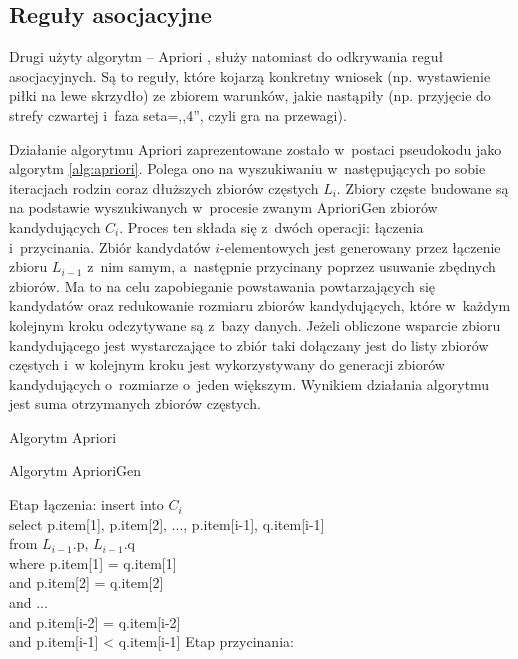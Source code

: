 \documentclass[a4paper,twoside,12pt]{book}
\newenvironment{algorytm}[1][]
  {\renewcommand{\algorithmcfname}{Algorytm}%
   \begin{algorithm}[#1]%
  }{\end{algorithm}}
\begin{document}
\subsection{Reguły asocjacyjne}
Drugi użyty algorytm -- Apriori \cite{bib:apriori}, służy natomiast do odkrywania reguł asocjacyjnych. Są to reguły, które kojarzą konkretny wniosek (np. wystawienie piłki na lewe skrzydło) ze zbiorem warunków, jakie nastąpiły (np. przyjęcie do strefy czwartej i~faza seta=,,4'', czyli gra na przewagi).

Działanie algorytmu Apriori zaprezentowane zostało w~postaci pseudokodu jako algorytm \ref{alg:apriori}. Polega ono na wyszukiwaniu w~następujących po sobie iteracjach rodzin coraz dłuższych zbiorów częstych $L_i$. Zbiory częste budowane są na podstawie wyszukiwanych w~procesie zwanym AprioriGen zbiorów kandydujących $C_i$. Proces ten składa się z~dwóch operacji: łączenia i~przycinania. Zbiór kandydatów $i$-elementowych jest generowany przez łączenie zbioru $L_{i-1}$ z~nim samym, a~następnie przycinany poprzez usuwanie zbędnych zbiorów. Ma to na celu zapobieganie powstawania powtarzających się kandydatów oraz redukowanie rozmiaru zbiorów kandydujących, które w~każdym kolejnym kroku odczytywane są z~bazy danych. Jeżeli obliczone wsparcie zbioru kandydującego jest wystarczające to zbiór taki dołączany jest do listy zbiorów częstych i~w kolejnym kroku jest wykorzystywany do generacji zbiorów kandydujących o~rozmiarze o~jeden większym. Wynikiem działania algorytmu jest suma otrzymanych zbiorów częstych.

\begin{algorytm}
\label{alg:apriori}
\caption{Algorytm Apriori}
\DontPrintSemicolon
\end{algorytm}

\begin{algorytm}
\label{alg:aprioriGen}
\caption{Algorytm AprioriGen}
\DontPrintSemicolon
Etap łączenia:\;
insert into $C_i$\\
select p.item[1], p.item[2], ..., p.item[i-1], q.item[i-1]\\
from $L_{i-1}$.p, $L_{i-1}$.q\\
where p.item[1] = q.item[1]\\
  and p.item[2] = q.item[2]\\
  and ...\\
  and p.item[i-2] = q.item[i-2]\\
  and p.item[i-1] < q.item[i-1]\;
\;
Etap przycinania:\;
\end{algorytm}
\end{document}
